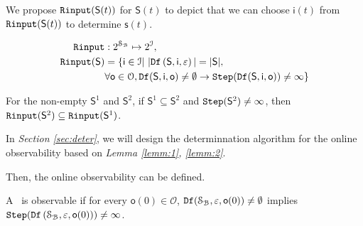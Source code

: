 We propose ${\tt Rinput}(\mathsf{S}(t))$ for $\mathsf{S}(t)$ to depict that we can choose $\mathsf{i}(t)$ from ${\tt Rinput}(\mathsf{S}(t))$ to determine $\mathsf{s}(t)$.

\begin{equation}
\begin{split}
{\tt Rinput}&:2^{\mathcal{S}_{\mathcal{B}}} \mapsto2^{\mathcal{I}},\\
{\tt Rinput}(\mathsf{S})&=\{\mathsf{i}\in \mathcal{I}|\  |{\tt Df}\left(\mathsf{S},\mathsf{i},\varepsilon\right)|=|\mathsf{S}|, \\
&\forall \mathsf{o} \in \mathcal{O}, {\tt Df}(\mathsf{S},\mathsf{i},\mathsf{o})\ne \emptyset \rightarrow {\tt Step}({\tt Df}(\mathsf{S},\mathsf{i},\mathsf{o}))\ne \infty\}
\end{split}
\end{equation}
\begin{lemma}
For the non-empty $\mathsf{S}^{1}$ and $\mathsf{S}^{2}$, if $\mathsf{S}^{1}\subseteq\mathsf{S}^{2}$ and ${\tt Step}(\mathsf{S}^{2})\ne\infty$, then ${\tt Rinput}(\mathsf{S}^2)\subseteq{\tt Rinput}(\mathsf{S}^1)$.
\label{lemm:2}
\end{lemma}

In {\em Section \ref{sec:deter}}, we will design the determinnation algorithm for the online observability based on {\em Lemma \ref{lemm:1}, \ref{lemm:2}}.


Then, the online observability can be defined.
\begin{definition}
 A \BCN\ is observable
if for every $\mathsf{o}(0)\in  \mathcal{O}$, ${\tt Df}(\mathcal{S}_{\mathcal{B}},\varepsilon, \mathsf{o}(0))\ne\emptyset$ implies ${\tt Step}({\tt Df}\left(\mathcal{S}_{\mathcal{B}},\varepsilon,\mathsf{o}(0)\right))\ne\infty$.
\end{definition}


